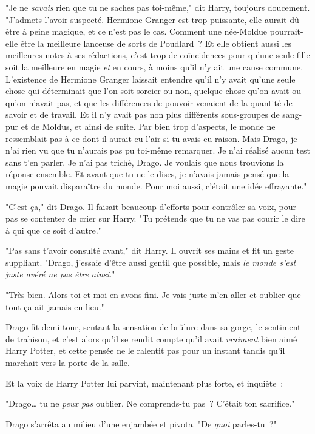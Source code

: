 "Je ne \emph{savais} rien que tu ne saches pas toi-même," dit Harry, toujours doucement. "J'admets l'avoir suspecté. Hermione Granger est trop puissante, elle aurait dû être à peine magique, et ce n'est pas le cas. Comment une née-Moldue pourrait-elle être la meilleure lanceuse de sorts de Poudlard~? Et elle obtient aussi les meilleures notes à ses rédactions, c'est trop de coïncidences pour qu'une seule fille soit la meilleure en magie \emph{et} en cours, à moins qu'il n'y ait une cause commune. L'existence de Hermione Granger laissait entendre qu'il n'y avait qu'une seule chose qui déterminait que l'on soit sorcier ou non, quelque chose qu'on avait ou qu'on n'avait pas, et que les différences de pouvoir venaient de la quantité de savoir et de travail. Et il n'y avait pas non plus différents sous-groupes de sang-pur et de Moldus, et ainsi de suite. Par bien trop d'aspects, le monde ne ressemblait pas à ce dont il aurait eu l'air si tu avais eu raison. Mais Drago, je n'ai rien vu que tu n'aurais pas pu toi-même remarquer. Je n'ai réalisé aucun test sans t'en parler. Je n'ai pas triché, Drago. Je voulais que nous trouvions la réponse ensemble. Et avant que tu ne le dises, je n'avais jamais pensé que la magie pouvait disparaître du monde. Pour moi aussi, c'était une idée effrayante."

"C'est ça," dit Drago. Il faisait beaucoup d'efforts pour contrôler sa voix, pour pas se contenter de crier sur Harry. "Tu prétends que tu ne vas pas courir le dire à qui que ce soit d'autre."

"Pas sans t'avoir consulté avant," dit Harry. Il ouvrit ses mains et fit un geste suppliant. "Drago, j'essaie d'être aussi gentil que possible, mais \emph{le monde s'est juste avéré ne pas être ainsi.}"

"Très bien. Alors toi et moi en avons fini. Je vais juste m'en aller et oublier que tout ça ait jamais eu lieu."

Drago fit demi-tour, sentant la sensation de brûlure dans sa gorge, le sentiment de trahison, et c'est alors qu'il se rendit compte qu'il avait \emph{vraiment} bien aimé Harry Potter, et cette pensée ne le ralentit pas pour un instant tandis qu'il marchait vers la porte de la salle.

Et la voix de Harry Potter lui parvint, maintenant plus forte, et inquiète~:

"Drago… tu ne \emph{peux pas} oublier. Ne comprends-tu pas~? C'était ton sacrifice."

Drago s'arrêta au milieu d'une enjambée et pivota. "De \emph{quoi} parles-tu~?"


